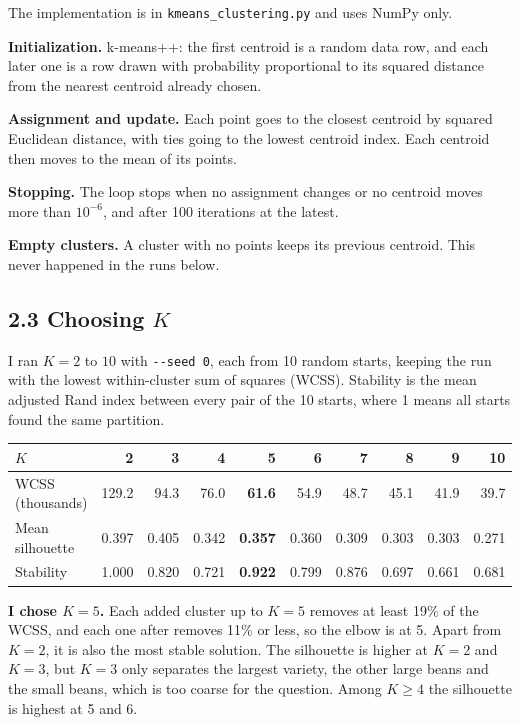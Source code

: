 \documentclass[11pt]{article}
\begin{document}
The implementation is in \texttt{kmeans\_clustering.py} and uses NumPy only.

\textbf{Initialization.} k-means++: the first centroid is a random data row, and each
later one is a row drawn with probability proportional to its squared distance from the
nearest centroid already chosen.

\textbf{Assignment and update.} Each point goes to the closest centroid by squared
Euclidean distance, with ties going to the lowest centroid index. Each centroid then
moves to the mean of its points.

\textbf{Stopping.} The loop stops when no assignment changes or no centroid moves more
than $10^{-6}$, and after 100 iterations at the latest.

\textbf{Empty clusters.} A cluster with no points keeps its previous centroid. This never
happened in the runs below.

\subsection*{2.3 Choosing $K$}

I ran $K=2$ to $10$ with \texttt{-{}-seed 0}, each from 10 random starts, keeping the run
with the lowest within-cluster sum of squares (WCSS). Stability is the mean adjusted Rand
index between every pair of the 10 starts, where 1 means all starts found the same
partition.

\begin{center}
\begin{tabular}{lrrrrrrrrr}
\hline
$K$ & 2 & 3 & 4 & \textbf{5} & 6 & 7 & 8 & 9 & 10\\
\hline
WCSS (thousands) & 129.2 & 94.3 & 76.0 & \textbf{61.6} & 54.9 & 48.7 & 45.1 & 41.9 & 39.7\\
Mean silhouette & 0.397 & 0.405 & 0.342 & \textbf{0.357} & 0.360 & 0.309 & 0.303 & 0.303 & 0.271\\
Stability & 1.000 & 0.820 & 0.721 & \textbf{0.922} & 0.799 & 0.876 & 0.697 & 0.661 & 0.681\\
\hline
\end{tabular}
\end{center}

\textbf{I chose $K=5$.} Each added cluster up to $K=5$ removes at least 19\% of the WCSS, and each one after removes 11\% or less, so the elbow is at 5. Apart from
$K=2$, it is also the most stable solution. The silhouette is higher at $K=2$ and $K=3$,
but $K=3$ only separates the largest variety, the other large beans and the small
beans, which is too coarse for the question. Among $K\ge4$ the silhouette is highest at 5
and 6.
\end{document}
